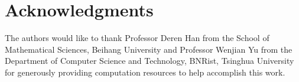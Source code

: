 \section*{Acknowledgments}


The authors would like to thank Professor Deren Han from the School of Mathematical Sciences, Beihang University and Professor Wenjian Yu from the Department of Computer Science and Technology, BNRist, Tsinghua University for generously providing computation resources to help accomplish this work.
